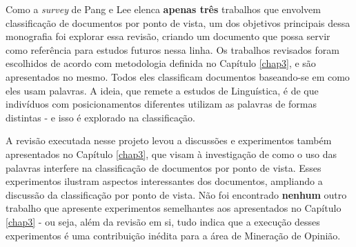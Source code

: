 


Como a \emph{survey} de Pang e Lee elenca \textbf{apenas três} trabalhos que envolvem classificação de documentos por ponto de vista, um dos objetivos principais dessa monografia foi explorar essa revisão, criando um documento que possa servir como referência para estudos futuros nessa linha. Os trabalhos revisados foram escolhidos de acordo com metodologia definida no Capítulo \ref{chap3}, e são apresentados no mesmo. Todos eles classificam documentos baseando-se em como eles usam palavras. A ideia, que remete a estudos de Linguística, é de que indivíduos com posicionamentos diferentes utilizam as palavras de formas distintas  \cite{teubert} - e isso é explorado na classificação. 

A revisão executada nesse projeto levou a discussões e experimentos também apresentados no Capítulo \ref{chap3}, que visam à investigação de como o uso das palavras interfere na classificação de documentos por ponto de vista. Esses experimentos ilustram aspectos interessantes dos documentos, ampliando a discussão da classificação por ponto de vista. Não foi encontrado \textbf{nenhum} outro trabalho que apresente experimentos semelhantes aos apresentados no Capítulo \ref{chap3} - ou seja, além da revisão em si, tudo indica que a execução desses experimentos é uma contribuição inédita para a área de Mineração de Opinião. 

